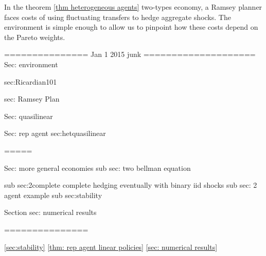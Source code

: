 In the theorem \ref{thm heterogeneous agents} two-types economy,
a Ramsey planner faces  costs of using  fluctuating transfers to hedge aggregate shocks.
The  environment is simple enough to allow us to pinpoint how these costs depend on the Pareto weights.


=============== Jan 1 2015 junk  ====================
{Sec: environment}

{sec:Ricardian101}

{sec: Ramsey Plan}

{Sec: quasilinear}

{Sec: rep agent}
{sec:hetquasilinear}

=====

{Sec: more general economies}
  sub  {sec: two bellman equation}
  
 sub  {sec:2complete}   complete hedging eventually with binary iid shocks
 sub {sec: 2 agent example}
 sub  {sec:stability}
 
 Section  {sec: numerical results}
 
 
 ===============
 
 \ref{sec:stability} \ref{thm: rep agent linear policies} \ref{sec: numerical results}



